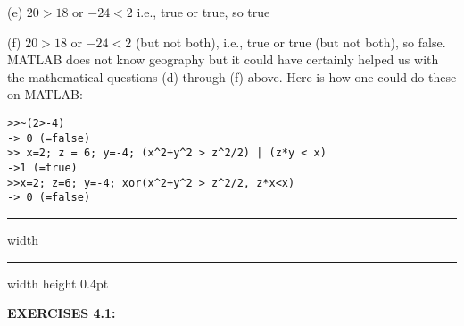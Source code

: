 \documentclass[../main.tex]{subfiles}
\begin{document}
(e) $20>18$ or $-24<2$ i.e., true or true, so true

(f) $20>18$ or $-24<2$ (but not both), i.e., true or true (but not both), so false.\\

MATLAB does not know geography but it could have certainly helped us with the mathematical questions (d) through (f) above. Here is how one could do these on MATLAB:

\begin{verbatim}
>>~(2>-4)
-> 0 (=false)
>> x=2; z = 6; y=-4; (x^2+y^2 > z^2/2) | (z*y < x)
->1 (=true)
>>x=2; z=6; y=-4; xor(x^2+y^2 > z^2/2, z*x<x)
-> 0 (=false) 
\end{verbatim}

\hrule width \hsize \kern 1pt \hrule width \hsize height 0.4pt

\hspace{0.1cm}

\textbf{EXERCISES 4.1: }
\end{document}

